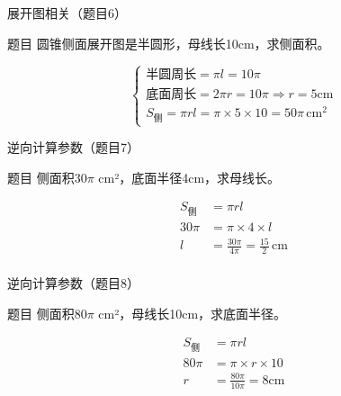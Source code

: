 \begin{frame}{展开图相关（题目6）}
    \begin{block}{题目}
    圆锥侧面展开图是半圆形，母线长10cm，求侧面积。
    \end{block}
    
    \pause

    \begin{equation*}
    \begin{cases}
    \text{半圆周长} = \pi l = 10\pi \\
    \text{底面周长} = 2\pi r = 10\pi \Rightarrow r = 5\text{cm} \\
    S_{\text{侧}} = \pi r l = \pi \times 5 \times 10 = 50\pi \,\text{cm}^2
    \end{cases}
    \end{equation*}
    \end{frame}



\begin{frame}{逆向计算参数（题目7）}
    \begin{block}{题目}
    侧面积30$\pi$ cm²，底面半径4cm，求母线长。
    \end{block}
    \pause
    
    \begin{align*}
    S_{\text{侧}} &= \pi r l \\
    30\pi &= \pi \times 4 \times l \\
    l &= \frac{30\pi}{4\pi} = \frac{15}{2}\,\text{cm} \\
    \end{align*}
    

    \end{frame}
    
    \begin{frame}{逆向计算参数（题目8）}
    \begin{block}{题目}
    侧面积80$\pi$ cm²，母线长10cm，求底面半径。
    \end{block}
    \pause
    
    $$
    \begin{aligned}
    S_{\text{侧}} &= \pi r l \\
    80\pi &= \pi \times r \times 10 \\
    r &= \frac{80\pi}{10\pi} = 8\text{cm}
    \end{aligned}
    $$
    
   
    \end{frame}